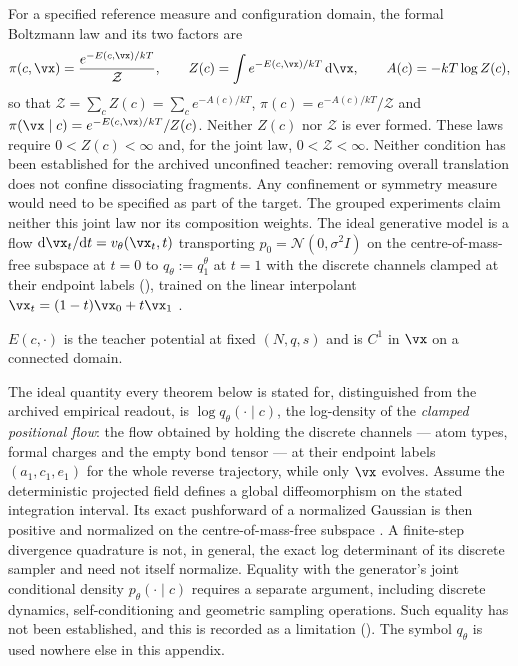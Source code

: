 For a specified reference measure and configuration domain, the formal Boltzmann
law and its two factors are
\begin{equation}
  \pi(c,\vx) = \frac{e^{-E(c,\vx)/kT}}{\mathcal{Z}},
  \qquad
  Z(c) = \int e^{-E(c,\vx)/kT}\,\mathrm{d}\vx,
  \qquad
  A(c) = -kT \log Z(c),
  \label{eq:app-targets}
\end{equation}
so that $\mathcal{Z} = \sum_{c} Z(c) = \sum_c e^{-A(c)/kT}$,
$\pi(c) = e^{-A(c)/kT}/\mathcal{Z}$ and
$\pi(\vx \mid c) = e^{-E(c,\vx)/kT}/Z(c)$. Neither $Z(c)$ nor $\mathcal{Z}$ is
ever formed. These laws require $0<Z(c)<\infty$ and, for the joint law,
$0<\mathcal Z<\infty$. Neither condition has been established for the archived
unconfined teacher: removing overall translation does not confine dissociating
fragments. Any confinement or symmetry measure would need to be specified as part
of the target. The grouped experiments claim neither this joint law nor its composition
weights. The ideal generative model is a flow $\mathrm{d}\vx_t/\mathrm{d}t =
v_\theta(\vx_t,t)$ transporting $p_0 = \mathcal{N}(0,\sigma^2 I)$ on the
centre-of-mass-free subspace at $t=0$ to $q_\theta := q_1^\theta$ at $t=1$ with
the discrete channels clamped at their endpoint labels (),
trained on the linear interpolant
$\vx_t = (1-t)\vx_0 + t\vx_1$ \citep{lipman2023flowmatching,liu2023rectifiedflow,%
albergo2023interpolants}.

\begin{assumption}
\label{ass:A1}
$E(c,\cdot)$ is the teacher potential at fixed $(N,q,s)$ and is $C^1$ in $\vx$ on
a connected domain.
\end{assumption}

\begin{assumption}
\label{ass:A2}
The ideal quantity every theorem below is stated for, distinguished from the archived empirical readout, is
$\log q_\theta(\cdot \mid c)$, the log-density of the \emph{clamped
positional flow}: the flow obtained by holding the discrete channels --- atom
types, formal charges and the empty bond tensor --- at their endpoint labels
$(a_1, c_1, e_1)$ for the whole reverse trajectory, while only $\vx$ evolves.
Assume the deterministic projected field defines a global diffeomorphism on the
stated integration interval. Its exact pushforward of a normalized Gaussian is
then positive and normalized on the centre-of-mass-free subspace \citep{ffjord}.
A finite-step divergence quadrature is not, in general, the exact log determinant
of its discrete sampler and need not itself normalize. Equality with the generator's joint conditional density $p_\theta(\cdot\mid c)$ requires a separate argument, including discrete dynamics, self-conditioning and geometric sampling operations. Such equality has not been established, and
this is recorded as a limitation (). The symbol $q_\theta$ is
used nowhere else in this appendix.
\end{assumption}

